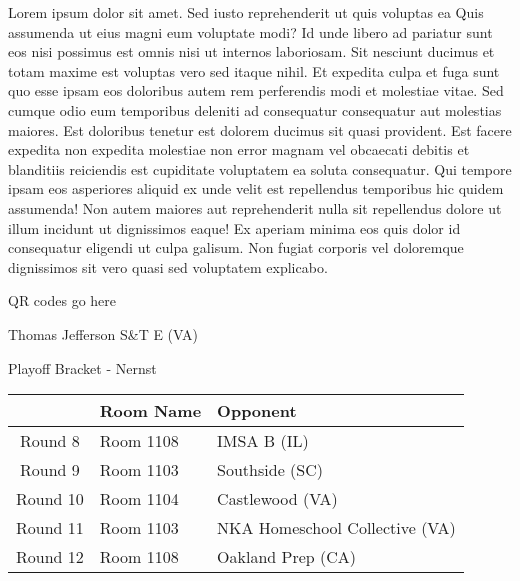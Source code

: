 \documentclass{article}%
\begin{document}
\vspace*{8pt}%
\linebreak%
\newline%
\newline%
Lorem ipsum dolor sit amet. Sed iusto reprehenderit ut quis voluptas ea Quis assumenda ut eius magni eum voluptate modi? Id unde libero ad pariatur sunt eos nisi possimus est omnis nisi ut internos laboriosam. Sit nesciunt ducimus et totam maxime est voluptas vero sed itaque nihil. Et expedita culpa et fuga sunt quo esse ipsam eos doloribus autem rem perferendis modi et molestiae vitae.\newline%
\newline%
Sed cumque odio eum temporibus deleniti ad consequatur consequatur aut molestias maiores. Est doloribus tenetur est dolorem ducimus sit quasi provident. Est facere expedita non expedita molestiae non error magnam vel obcaecati debitis et blanditiis reiciendis est cupiditate voluptatem ea soluta consequatur. Qui tempore ipsam eos asperiores aliquid ex unde velit est repellendus temporibus hic quidem assumenda!\newline%
\newline%
Non autem maiores aut reprehenderit nulla sit repellendus dolore ut illum incidunt ut dignissimos eaque! Ex aperiam minima eos quis dolor id consequatur eligendi ut culpa galisum. Non fugiat corporis vel doloremque dignissimos sit vero quasi sed voluptatem explicabo.\newline%
\newline%
%
\vspace*{30pt}%
\begin{center}%
\begin{Huge}%
QR codes go here%
\end{Huge}%
\end{center}%
\newpage%
\begin{center}%
\begin{Huge}%
Thomas Jefferson S\&T E (VA)%
\end{Huge}%
\vspace*{8pt}%
\linebreak%
\begin{Large}%
Playoff Bracket {-} Nernst%
\end{Large}%
\end{center}%
%
\begin{tabularx}{\textwidth}{|c|Y|Y|}%
\hline%
&Room Name&Opponent\\%
\hline%
Round 8&Room 1108&IMSA B (IL)\\%
Round 9&Room 1103&Southside (SC)\\%
Round 10&Room 1104&Castlewood (VA)\\%
Round 11&Room 1103&NKA Homeschool Collective (VA)\\%
Round 12&Room 1108&Oakland Prep (CA)\\%
\hline%
\end{tabularx}%
\end{document}

